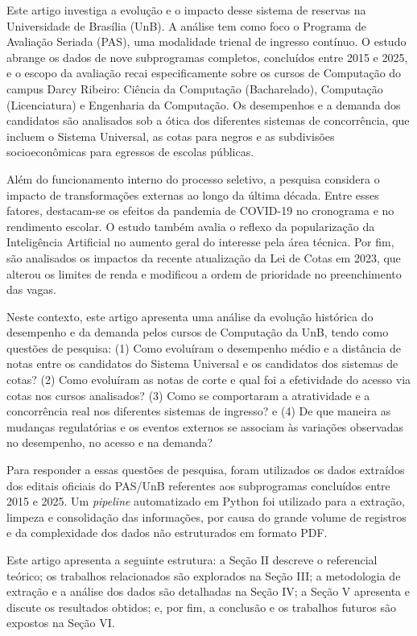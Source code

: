 \documentclass[12pt]{article}
\begin{document}
Este artigo investiga a evolução e o impacto desse sistema de reservas na Universidade de Brasília (UnB). A análise tem como foco o Programa de Avaliação Seriada (PAS), uma modalidade trienal de ingresso contínuo. O estudo abrange os dados de nove subprogramas completos, concluídos entre 2015 e 2025, e o escopo da avaliação recai especificamente sobre os cursos de Computação do campus Darcy Ribeiro: Ciência da Computação (Bacharelado), Computação (Licenciatura) e Engenharia da Computação. Os desempenhos e a demanda dos candidatos são analisados sob a ótica dos diferentes sistemas de concorrência, que incluem o Sistema Universal, as cotas para negros e as subdivisões socioeconômicas para egressos de escolas públicas.

Além do funcionamento interno do processo seletivo, a pesquisa considera o impacto de transformações externas ao longo da última década. Entre esses fatores, destacam-se os efeitos da pandemia de COVID-19 no cronograma e no rendimento escolar. O estudo também avalia o reflexo da popularização da Inteligência Artificial no aumento geral do interesse pela área técnica. Por fim, são analisados os impactos da recente atualização da Lei de Cotas em 2023, que alterou os limites de renda e modificou a ordem de prioridade no preenchimento das vagas.

Neste contexto, este artigo apresenta uma análise da evolução histórica do desempenho e da demanda pelos cursos de Computação da UnB, tendo como questões de pesquisa: (1) Como evoluíram o desempenho médio e a distância de notas entre os candidatos do Sistema Universal e os candidatos dos sistemas de cotas? (2) Como evoluíram as notas de corte e qual foi a efetividade do acesso via cotas nos cursos analisados? (3) Como se comportaram a atratividade e a concorrência real nos diferentes sistemas de ingresso? e (4) De que maneira as mudanças regulatórias e os eventos externos se associam às variações observadas no desempenho, no acesso e na demanda?

Para responder a essas questões de pesquisa, foram utilizados os dados extraídos dos editais oficiais do PAS/UnB referentes aos subprogramas concluídos entre 2015 e 2025. Um \textit{pipeline} automatizado em Python foi utilizado para a extração, limpeza e consolidação das informações, por causa do grande volume de registros e da complexidade dos dados não estruturados em formato PDF.

Este artigo apresenta a seguinte estrutura: a Seção II descreve o referencial teórico; os trabalhos relacionados são explorados na Seção III; a metodologia de extração e a análise dos dados são detalhadas na Seção IV; a Seção V apresenta e discute os resultados obtidos; e, por fim, a conclusão e os trabalhos futuros são expostos na Seção VI.
\end{document}

